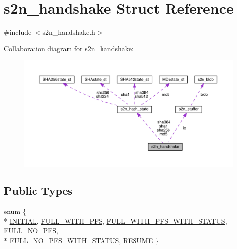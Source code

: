 \hypertarget{structs2n__handshake}{}\section{s2n\+\_\+handshake Struct Reference}
\label{structs2n__handshake}


{\ttfamily \#include $<$s2n\+\_\+handshake.\+h$>$}



Collaboration diagram for s2n\+\_\+handshake\+:\nopagebreak
\begin{figure}[H]
\begin{center}
\leavevmode
\includegraphics[width=350pt]{structs2n__handshake__coll__graph}
\end{center}
\end{figure}
\subsection*{Public Types}
\begin{DoxyCompactItemize}
\item 
enum \{ \\*
\hyperlink{structs2n__handshake_a1b70d876770ccff427513794d6b0b2a7a7116db6906963fd0720c4a85be250cf4}{I\+N\+I\+T\+I\+AL}, 
\hyperlink{structs2n__handshake_a1b70d876770ccff427513794d6b0b2a7ad3231f658eab6113d90103a5089b5835}{F\+U\+L\+L\+\_\+\+W\+I\+T\+H\+\_\+\+P\+FS}, 
\hyperlink{structs2n__handshake_a1b70d876770ccff427513794d6b0b2a7a51077b81010b74e2332bda76a65f89b6}{F\+U\+L\+L\+\_\+\+W\+I\+T\+H\+\_\+\+P\+F\+S\+\_\+\+W\+I\+T\+H\+\_\+\+S\+T\+A\+T\+US}, 
\hyperlink{structs2n__handshake_a1b70d876770ccff427513794d6b0b2a7a73b1ac97302d4f60da50d6f943031718}{F\+U\+L\+L\+\_\+\+N\+O\+\_\+\+P\+FS}, 
\\*
\hyperlink{structs2n__handshake_a1b70d876770ccff427513794d6b0b2a7abc0c04489f0bad0cae91ea606325442d}{F\+U\+L\+L\+\_\+\+N\+O\+\_\+\+P\+F\+S\+\_\+\+W\+I\+T\+H\+\_\+\+S\+T\+A\+T\+US}, 
\hyperlink{structs2n__handshake_a1b70d876770ccff427513794d6b0b2a7a401283aaa98a76b506f2198465bd7009}{R\+E\+S\+U\+ME}
 \}
\end{DoxyCompactItemize}
